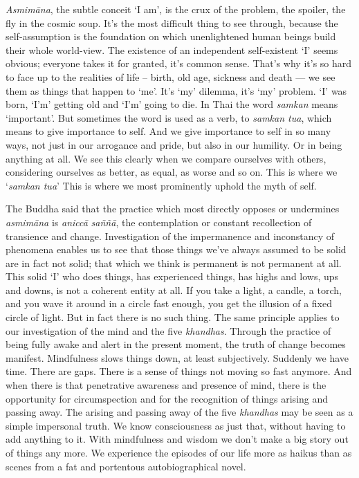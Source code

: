 \emph{Asmimāna}, the subtle conceit `I am', is the crux of the problem,
the spoiler, the fly in the cosmic soup. It's the most difficult thing
to see through, because the self-assumption is the foundation on which
unenlightened human beings build their whole world-view. The existence
of an independent self-existent `I' seems obvious; everyone takes it for
granted, it's common sense. That's why it's so hard to face up to the
realities of life -- birth, old age, sickness and death --- we see them
as things that happen to `me'. It's `my' dilemma, it's `my' problem. `I'
was born, `I'm' getting old and `I'm' going to die. In Thai the word
\emph{samkan} means `important'. But sometimes the word is used as a
verb, to \emph{samkan tua}, which means to give importance to self. And
we give importance to self in so many ways, not just in our arrogance
and pride, but also in our humility. Or in being anything at all. We see
this clearly when we compare ourselves with others, considering
ourselves as better, as equal, as worse and so on. This is where we
`\emph{samkan tua}' This is where we most prominently uphold the myth of
self.

The Buddha said that the practice which most directly opposes or
undermines \emph{asmimāna} is \emph{aniccā} \emph{saññā}, the
contemplation or constant recollection of transience and change.
Investigation of the impermanence and inconstancy of phenomena enables
us to see that those things we've always assumed to be solid are in fact
not solid; that which we think is permanent is not permanent at all.
This solid `I' who does things, has experienced things, has highs and
lows, ups and downs, is not a coherent entity at all. If you take a
light, a candle, a torch, and you wave it around in a circle fast
enough, you get the illusion of a fixed circle of light. But in fact
there is no such thing. The same principle applies to our investigation
of the mind and the five \emph{khandhas}. Through the practice of being
fully awake and alert in the present moment, the truth of change becomes
manifest. Mindfulness slows things down, at least subjectively. Suddenly
we have time. There are gaps. There is a sense of things not moving so
fast anymore. And when there is that penetrative awareness and presence
of mind, there is the opportunity for circumspection and for the
recognition of things arising and passing away. The arising and passing
away of the five \emph{khandhas} may be seen as a simple impersonal
truth. We know consciousness as just that, without having to add
anything to it. With mindfulness and wisdom we don't make a big story
out of things any more. We experience the episodes of our life more as
haikus than as scenes from a fat and portentous autobiographical novel.

